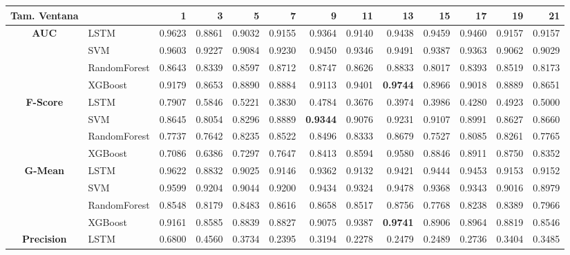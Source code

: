 \begin{table}[h]
	\centering
	\begin{adjustbox}{max width=15cm}
		\begin{tabular}{|c|l|r|r|r|r|r|r|r|r|r|r|r|}
			
			\hline
			\textbf{Tam. Ventana}&         &      1  &      3  &      5  &      7  &      9  &      11 &      13 &      15 &      17 &      19 &      21 \\
			\hline
			\textbf{AUC} & LSTM &  0.9623 &  0.8861 &  0.9032 &  0.9155 &  0.9364 &  0.9140 &  0.9438 &  0.9459 &  0.9460 &  0.9157 &  0.9157 \\
			& SVM &  0.9603 &  0.9227 &  0.9084 &  0.9230 &  0.9450 &  0.9346 &  0.9491 &  0.9387 &  0.9363 &  0.9062 &  0.9029 \\
			& RandomForest &  0.8643 &  0.8339 &  0.8597 &  0.8712 &  0.8747 &  0.8626 &  0.8833 &  0.8017 &  0.8393 &  0.8519 &  0.8173 \\
			& XGBoost &  0.9179 &  0.8653 &  0.8890 &  0.8884 &  0.9113 &  0.9401 &  \textbf{0.9744} &  0.8966 &  0.9018 &  0.8889 &  0.8651 \\
			\hline
			\textbf{F-Score} & LSTM &  0.7907 &  0.5846 &  0.5221 &  0.3830 &  0.4784 &  0.3676 &  0.3974 &  0.3986 &  0.4280 &  0.4923 &  0.5000 \\
			& SVM &  0.8645 &  0.8054 &  0.8296 &  0.8889 &  \textbf{0.9344} &  0.9076 &  0.9231 &  0.9107 &  0.8991 &  0.8627 &  0.8660 \\
			& RandomForest &  0.7737 &  0.7642 &  0.8235 &  0.8522 &  0.8496 &  0.8333 &  0.8679 &  0.7527 &  0.8085 &  0.8261 &  0.7765 \\
			& XGBoost &  0.7086 &  0.6386 &  0.7297 &  0.7647 &  0.8413 &  0.8594 &  0.9580 &  0.8846 &  0.8911 &  0.8750 &  0.8352 \\
			\hline
			\textbf{G-Mean} & LSTM &  0.9622 &  0.8832 &  0.9025 &  0.9146 &  0.9362 &  0.9132 &  0.9421 &  0.9444 &  0.9453 &  0.9153 &  0.9152 \\
			& SVM &  0.9599 &  0.9204 &  0.9044 &  0.9200 &  0.9434 &  0.9324 &  0.9478 &  0.9368 &  0.9343 &  0.9016 &  0.8979 \\
			& RandomForest &  0.8548 &  0.8179 &  0.8483 &  0.8616 &  0.8658 &  0.8517 &  0.8756 &  0.7768 &  0.8238 &  0.8389 &  0.7966 \\
			& XGBoost &  0.9161 &  0.8585 &  0.8839 &  0.8827 &  0.9075 &  0.9387 &  \textbf{0.9741} &  0.8906 &  0.8964 &  0.8819 &  0.8546 \\
			\hline
			\textbf{Precision} & LSTM &  0.6800 &  0.4560 &  0.3734 &  0.2395 &  0.3194 &  0.2278 &  0.2479 &  0.2489 &  0.2736 &  0.3404 &  0.3485 \\

\end{tabular}
\end{adjustbox}
\end{table}
